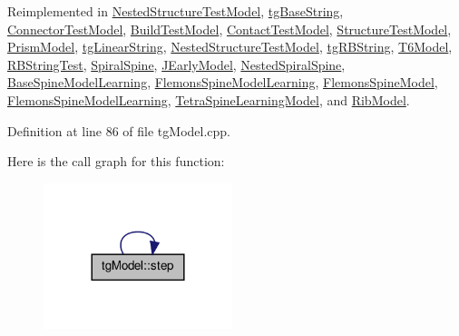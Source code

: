 Reimplemented in \hyperlink{class_nested_structure_test_model_af670e0e83b05c97575e7ba96436652d4}{Nested\-Structure\-Test\-Model}, \hyperlink{classtg_base_string_aadd5b654c0a426f83645c0d63525aefb}{tg\-Base\-String}, \hyperlink{class_connector_test_model_a30e5b347373f77dc84584569d8ac7b4e}{Connector\-Test\-Model}, \hyperlink{class_build_test_model_aabd9261840e8466e8648585ccca67397}{Build\-Test\-Model}, \hyperlink{class_contact_test_model_a4ca4c597ea5333b0230fb3f05eebca97}{Contact\-Test\-Model}, \hyperlink{class_structure_test_model_a5496e69ff5d9c7bf1ecf84686900ea37}{Structure\-Test\-Model}, \hyperlink{class_prism_model_af56267cc470ba060c634f869ab04d2d5}{Prism\-Model}, \hyperlink{classtg_linear_string_ae6ffae9c4a4a9501b1933a2beceee67f}{tg\-Linear\-String}, \hyperlink{class_nested_structure_test_model_a525541e96fd433c3cfc5fc3a574b655e}{Nested\-Structure\-Test\-Model}, \hyperlink{classtg_r_b_string_a656dac3acb8e7d4f4204a5bb2ea6ce06}{tg\-R\-B\-String}, \hyperlink{class_t6_model_ad6689b7750728d58a2a9b1b00902082b}{T6\-Model}, \hyperlink{class_r_b_string_test_af105e21e1166be1546b1cd37c74b8d3b}{R\-B\-String\-Test}, \hyperlink{class_spiral_spine_aec58e69f08f72da5806c104a77e69db1}{Spiral\-Spine}, \hyperlink{class_j_early_model_a9a8eddf8d5f8f08d1717d64ee2db1b4e}{J\-Early\-Model}, \hyperlink{class_nested_spiral_spine_adcf53d51b436c471765513c9ab203be7}{Nested\-Spiral\-Spine}, \hyperlink{class_base_spine_model_learning_abe197971d9b438aaaf36d2e8bddfc739}{Base\-Spine\-Model\-Learning}, \hyperlink{class_flemons_spine_model_learning_ab0c5bc7a89e7358015877ed147b66da9}{Flemons\-Spine\-Model\-Learning}, \hyperlink{class_flemons_spine_model_ace12ed6daa45bdf130c70774df3afde9}{Flemons\-Spine\-Model}, \hyperlink{class_flemons_spine_model_learning_a29969832ceaa6143afcce7dfe1d6d8e8}{Flemons\-Spine\-Model\-Learning}, \hyperlink{class_tetra_spine_learning_model_a5b3b6e1543c56deafe50d7cf3478ebfe}{Tetra\-Spine\-Learning\-Model}, and \hyperlink{class_rib_model_a71a67cc85f18bf8bf72c82b3e7d8c538}{Rib\-Model}.



Definition at line 86 of file tg\-Model.\-cpp.



Here is the call graph for this function\-:\nopagebreak
\begin{figure}[H]
\begin{center}
\leavevmode
\includegraphics[width=156pt]{classtg_model_acc6f9ae005f9f51447d7efe5f1815737_cgraph}
\end{center}
\end{figure}


